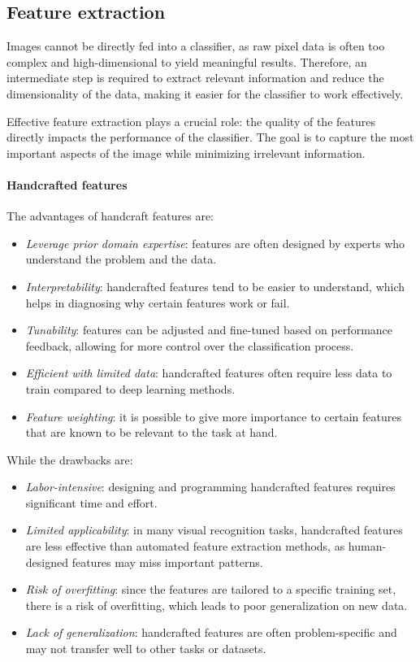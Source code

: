 \subsection{Feature extraction}

Images cannot be directly fed into a classifier, as raw pixel data is often too complex and high-dimensional to yield meaningful results. 
Therefore, an intermediate step is required to extract relevant information and reduce the dimensionality of the data, making it easier for the classifier to work effectively.

Effective feature extraction plays a crucial role: the quality of the features directly impacts the performance of the classifier. 
The goal is to capture the most important aspects of the image while minimizing irrelevant information.

\paragraph*{Handcrafted features}
The advantages of handcraft features are: 
\begin{itemize}
    \item \textit{Leverage prior domain expertise}: features are often designed by experts who understand the problem and the data.
    \item \textit{Interpretability}: handcrafted features tend to be easier to understand, which helps in diagnosing why certain features work or fail.
    \item \textit{Tunability}: features can be adjusted and fine-tuned based on performance feedback, allowing for more control over the classification process.
    \item \textit{Efficient with limited data}: handcrafted features often require less data to train compared to deep learning methods.
    \item \textit{Feature weighting}: it is possible to give more importance to certain features that are known to be relevant to the task at hand.
\end{itemize}
While the drawbacks are: 
\begin{itemize}
    \item \textit{Labor-intensive}: designing and programming handcrafted features requires significant time and effort.
    \item \textit{Limited applicability}: in many visual recognition tasks, handcrafted features are less effective than automated feature extraction methods, as human-designed features may miss important patterns.
    \item \textit{Risk of overfitting}: since the features are tailored to a specific training set, there is a risk of overfitting, which leads to poor generalization on new data.
    \item \textit{Lack of generalization}: handcrafted features are often problem-specific and may not transfer well to other tasks or datasets.
\end{itemize}

